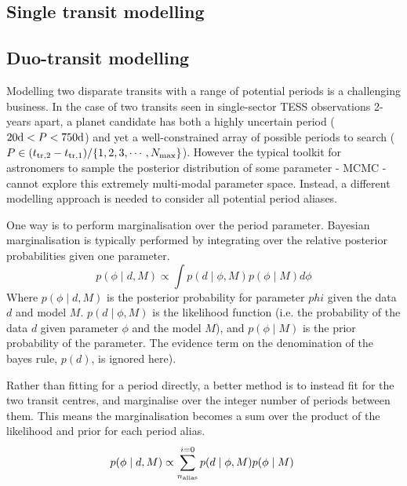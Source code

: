 \documentclass{article}
\begin{document}
\subsection{Single transit modelling}



\subsection{Duo-transit modelling}
Modelling two disparate transits with a range of potential periods is a challenging business.
In the case of two transits seen in single-sector TESS observations 2-years apart, a planet candidate has both a highly uncertain period ($20{\rm d}< P <750{\rm d}$) and yet a well-constrained array of possible periods to search ($P \in (t_{{\rm tr},2}-t_{{\rm tr},1})/\{1,2,3, \cdots, N_{\rm max}\}$).
However the typical toolkit for astronomers to sample the posterior distribution of some parameter - MCMC - cannot explore this extremely multi-modal parameter space.
Instead, a different modelling approach is needed to consider all potential period aliases.

One way is to perform marginalisation over the period parameter.
Bayesian marginalisation is typically performed by integrating over the relative posterior probabilities given one parameter.
\begin{equation}
p(\phi \mid d, M) \propto \int p(d \mid \phi, M) p (\phi \mid M) d\phi 
\end{equation}
Where $p(\phi \mid d, M)$ is the posterior probability for parameter $phi$ given the data $d$ and model $M$. $p(d \mid \phi, M)$ is the likelihood function (i.e. the probability of the data $d$ given parameter $\phi$ and the model $M$), and $p (\phi \mid M)$ is the prior probability of the parameter.
The evidence term on the denomination of the bayes rule, $p(d)$, is ignored here).

Rather than fitting for a period directly, a better method is to instead fit for the two transit centres, and marginalise over the integer number of periods between them.
This means the marginalisation becomes a sum over the product of the likelihood and prior for each period alias.
\begin{equation}
p(\phi \mid d, M) \propto \sum^{i=0}_{n_{\rm alias}} p(d \mid \phi, M) p (\phi \mid M) \;
\end{equation}
\end{document}
